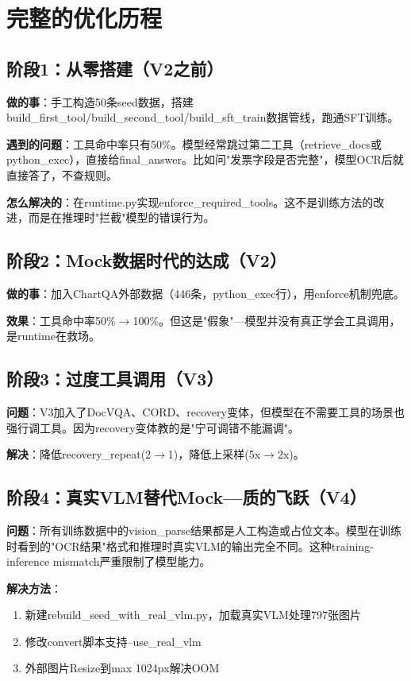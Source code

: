 \documentclass[fontset=none,11pt,a4paper]{ctexart}
\begin{document}
\newpage

\section{完整的优化历程}

\subsection{阶段1：从零搭建（V2之前）}

\textbf{做的事}：手工构造50条seed数据，搭建build\_first\_tool/build\_second\_tool/build\_sft\_train数据管线，跑通SFT训练。

\textbf{遇到的问题}：工具命中率只有50\%。模型经常跳过第二工具（retrieve\_docs或python\_exec），直接给final\_answer。比如问"发票字段是否完整"，模型OCR后就直接答了，不查规则。

\textbf{怎么解决的}：在runtime.py实现enforce\_required\_tools。这不是训练方法的改进，而是在推理时"拦截"模型的错误行为。

\subsection{阶段2：Mock数据时代的达成（V2）}

\textbf{做的事}：加入ChartQA外部数据（446条，python\_exec行），用enforce机制兜底。

\textbf{效果}：工具命中率50\%$\to$100\%。但这是"假象"---模型并没有真正学会工具调用，是runtime在救场。

\subsection{阶段3：过度工具调用（V3）}

\textbf{问题}：V3加入了DocVQA、CORD、recovery变体，但模型在不需要工具的场景也强行调工具。因为recovery变体教的是"宁可调错不能漏调"。

\textbf{解决}：降低recovery\_repeat(2$\to$1)，降低上采样(5x$\to$2x)。

\subsection{阶段4：真实VLM替代Mock---质的飞跃（V4）}

\textbf{问题}：所有训练数据中的vision\_parse结果都是人工构造或占位文本。模型在训练时看到的"OCR结果"格式和推理时真实VLM的输出完全不同。这种training-inference mismatch严重限制了模型能力。

\textbf{解决方法}：
\begin{enumerate}[nosep]
    \item 新建rebuild\_seed\_with\_real\_vlm.py，加载真实VLM处理797张图片
    \item 修改convert脚本支持--use\_real\_vlm
    \item 外部图片Resize到max 1024px解决OOM
\end{enumerate}
\end{document}
